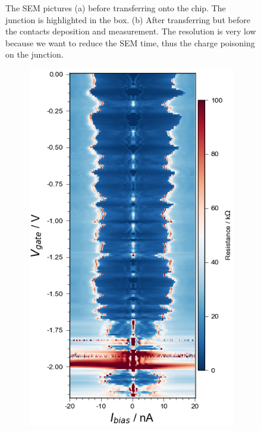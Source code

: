 \begin{figure}[h!]
\begin{subfigure}[b]{0.48\textwidth}
         \caption{}
         \label{}
     \end{subfigure}
     \caption{The SEM pictures (a) before transferring onto the chip. The junction is highlighted in the box. (b) After transferring but before the contacts deposition and measurement. The resolution is very low because we want to reduce the SEM time, thus the charge poisoning on the junction.}
    \label{Ibiasnw2}
\end{figure}
\begin{figure}[h!]
    \centering
    \begin{subfigure}[b]{0.48\textwidth}
         \centering
         \includegraphics[width=\textwidth]{Pic/NW2_finerscan_currentbias.png}

\end{subfigure}
\end{figure}
